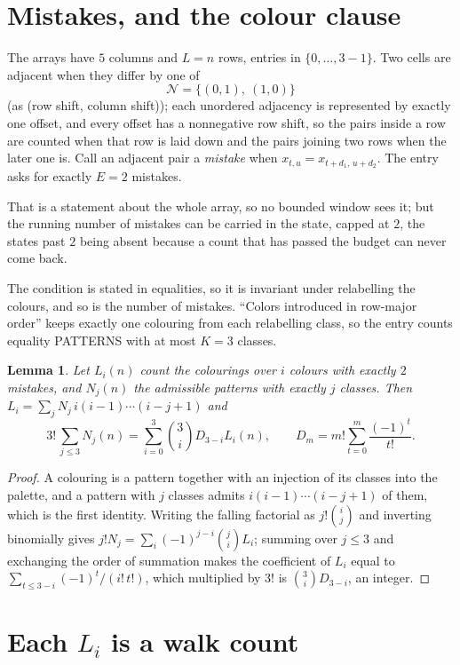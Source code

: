 \documentclass[11pt,a4paper]{article}
\theoremstyle{plain}
\newtheorem{lemma}[theorem]{Lemma}
\theoremstyle{definition}
\begin{document}
\section{Mistakes, and the colour clause}

The arrays have $5$ columns and $L=n$ rows, entries in $\{0,\dots,3-1\}$.
Two cells are adjacent when they differ by one of
\[
\mathcal N=\{(0,1),\ (1,0)\}
\]
(as (row shift, column shift)); each unordered adjacency is represented by exactly one
offset, and every offset has a nonnegative row shift, so the pairs inside a row are
counted when that row is laid down and the pairs joining two rows when the later one
is. Call an adjacent pair a \emph{mistake} when $x_{t,u}=x_{t+d_1,\,u+d_2}$. The entry asks for exactly
$E=2$ mistakes.

That is a statement about the whole array, so no bounded window sees it; but the running
number of mistakes can be carried in the state, capped at $2$, the states past $2$ being
absent because a count that has passed the budget can never come back.

The condition is stated in equalities, so it is invariant under relabelling the colours, and
so is the number of mistakes. ``Colors introduced in row-major order'' keeps exactly one
colouring from each relabelling class, so the entry counts equality PATTERNS with at most
$K=3$ classes.

\begin{lemma}\label{lem:inv}
Let $L_i(n)$ count the colourings over $i$ colours with exactly $2$ mistakes, and $N_j(n)$
the admissible patterns with exactly $j$ classes. Then
$L_i=\sum_j N_j\,i(i-1)\cdots(i-j+1)$ and
\[
3!\,\sum_{j\le3}N_j(n)=\sum_{i=0}^{3}\binom{3}{i}D_{3-i}L_i(n),
\qquad D_m=m!\sum_{t=0}^{m}\frac{(-1)^t}{t!} .
\]
\end{lemma}

\begin{proof}
A colouring is a pattern together with an injection of its classes into the palette, and a
pattern with $j$ classes admits $i(i-1)\cdots(i-j+1)$ of them, which is the first identity.
Writing the falling factorial as $j!\binom{i}{j}$ and inverting binomially gives
$j!N_j=\sum_i(-1)^{j-i}\binom{j}{i}L_i$; summing over $j\le3$ and exchanging the order
of summation makes the coefficient of $L_i$ equal to $\sum_{t\le3-i}(-1)^t/(i!\,t!)$,
which multiplied by $3!$ is $\binom{3}{i}D_{3-i}$, an integer.
\end{proof}

\section{Each $L_i$ is a walk count}
\end{document}
